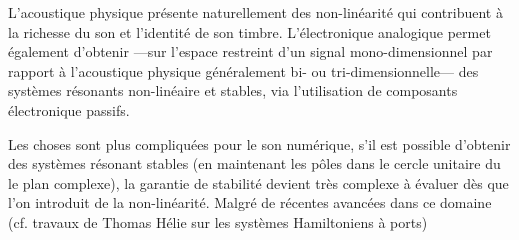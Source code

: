 L'acoustique physique présente naturellement des non-linéarité qui contribuent à la richesse du son et l'identité de son timbre. L'électronique analogique permet également d'obtenir —sur l'espace restreint d'un signal mono-dimensionnel par rapport à l'acoustique physique généralement bi- ou tri-dimensionnelle— des systèmes résonants non-linéaire et stables, via l'utilisation de composants électronique passifs.

Les choses sont plus compliquées pour le son numérique, s'il est possible d'obtenir des systèmes résonant stables (en maintenant les pôles dans le cercle unitaire du le plan complexe), la garantie de stabilité devient très complexe à évaluer dès que l'on introduit de la non-linéarité.
Malgré de récentes avancées dans ce domaine (cf. travaux de Thomas Hélie sur les systèmes Hamiltoniens à ports)

